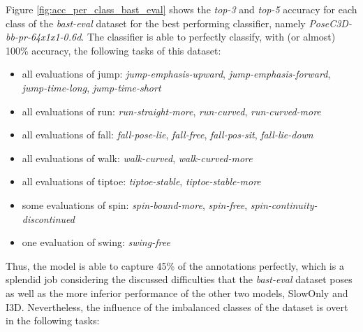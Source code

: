 \documentclass[extern,palatino]{cgMA}
\begin{document}
\bigskip
\noindent Figure \ref{fig:acc_per_class_bast_eval} shows the \textit{top-3} and \textit{top-5} accuracy for each class of the \textit{bast-eval} dataset for the best performing classifier, namely \textit{PoseC3D-bb-pr-64x1x1-0.6d}. The classifier is able to perfectly classify, with (or almost) 100\% accuracy, the following tasks of this dataset:

\begin{itemize}
    \item all evaluations of jump: \textit{jump-emphasis-upward}, \textit{jump-emphasis-forward}, \textit{jump-time-long}, \textit{jump-time-short}
    \item all evaluations of run: \textit{run-straight-more}, \textit{run-curved}, \textit{run-curved-more}
    \item all evaluations of fall: \textit{fall-pose-lie}, \textit{fall-free}, \textit{fall-pos-sit}, \textit{fall-lie-down}
    \item all evaluations of walk: \textit{walk-curved}, \textit{walk-curved-more}
    \item all evaluations of tiptoe: \textit{tiptoe-stable}, \textit{tiptoe-stable-more}
    \item some evaluations of spin: \textit{spin-bound-more}, \textit{spin-free}, \textit{spin-continuity-discontinued}
    \item one evaluation of swing: \textit{swing-free}
\end{itemize}

\noindent Thus, the model is able to capture 45\% of the annotations perfectly, which is a splendid job considering the discussed difficulties that the \textit{bast-eval} dataset poses as well as the more inferior performance of the other two models, SlowOnly and I3D. Nevertheless, the influence of the imbalanced classes of the dataset is overt in the following tasks:
\end{document}

